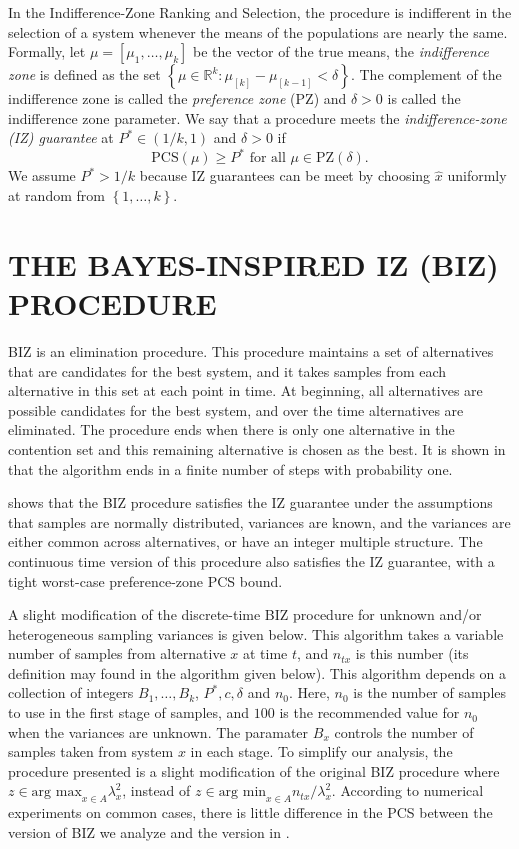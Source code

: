 \documentclass{wscpaperproc}
\theoremstyle{wsc}
\begin{document}
In the Indifference-Zone Ranking and Selection, the procedure is indifferent
in the selection of a system whenever the means of the populations
are nearly the same. Formally, let $\mu=\left[\mu_{1},\ldots,\mu_{k}\right]$
be the vector of the true means, the \emph{indifference zone} is defined
as the set $\left\{ \mu\in\mathbb{R}^{k}:\mu_{\left[k\right]}-\mu_{\left[k-1\right]}<\delta\right\} $.
The complement of the indifference zone is called the \emph{preference
zone} (PZ) and $\delta>0$ is called the indifference zone parameter.
We say that a procedure meets the \emph{indifference-zone (IZ) guarantee
}at $P^{*}\in\left(1/k,1\right)$ and $\delta>0$ if
\[
\mbox{PCS}\left(\mu\right)\geq P^{*}\mbox{ for all }\mu\in\mbox{PZ}\left(\delta\right).
\]
We assume $P^{*}>1/k$ because IZ guarantees can be meet by choosing
$\hat{x}$ uniformly at random from $\left\{ 1,\ldots,k\right\} $.


\section{THE BAYES-INSPIRED IZ (BIZ) PROCEDURE}
\label{sec:BIZ}

BIZ is an elimination procedure. This procedure maintains a set of
alternatives that are candidates for the best system, and it takes samples from each
alternative in this set at each point in time. At beginning, all alternatives
are possible candidates for the best system, and over the time alternatives are eliminated.
The procedure ends when there is only one alternative in the contention
set and this remaining alternative is chosen as the best. It is shown in  that the
algorithm ends in a finite number of steps with probability one. 

 shows that the BIZ procedure satisfies the IZ guarantee 
under the assumptions that samples are normally distributed, variances are known, and
the variances are either common across alternatives, or have an integer multiple structure.
The continuous time version of this procedure also satisfies the IZ guarantee, with a tight worst-case
preference-zone PCS bound.

A slight modification of the discrete-time BIZ procedure for unknown and/or heterogeneous sampling
variances is given below.  This algorithm takes a variable number of samples
from alternative $x$ at time $t$, and $n_{tx}$ is this number (its definition may found in the algorithm given below). 
This algorithm depends on a collection of integers $B_{1},\ldots,B_{k}$, $P^{*},c,\delta$
and $n_{0}$. Here, $n_{0}$ is the number of samples to use in the first
stage of samples, and $100$ is the recommended value for $n_{0}$ when the variances are unknown. The paramater
$B_{x}$ controls the number of samples taken from system $x$ in
each stage. To simplify our analysis, the procedure presented is a slight modification of the original BIZ 
procedure \cite{Frazier:BIZ} where $z \in \mbox{arg max}_{x\in A} \lambda^2_{x}$, instead 
of $z \in \mbox{arg min}_{x\in A} n_{tx} / \lambda^2_{x}$. According to numerical experiments on common cases, there is little difference in the PCS between the version of BIZ
we analyze and the version in .
\end{document}
